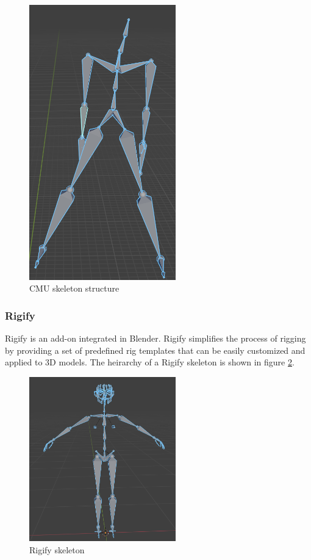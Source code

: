 \begin{figure}
  \centering \includegraphics[width = 2.5in]{images/background_work/cmu_skeleton.png}
  \caption{CMU skeleton structure}
  \label{fig:cmu_skeleton}
\end{figure}

\subsubsection{Rigify}

Rigify is an add-on integrated in Blender. Rigify simplifies the process of rigging by providing a set of predefined rig templates that can be easily customized and applied to 3D models. The heirarchy of a Rigify skeleton is shown in figure \ref{fig:rigify_skeleton}.

\begin{figure}
  \centering \includegraphics[width = 2.5in]{images/background_work/rigify_skeleton.png}
  \caption{Rigify skeleton}
  \label{fig:rigify_skeleton}
\end{figure}

